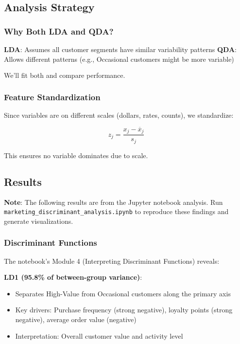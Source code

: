 \documentclass[
]{article}
\begin{document}
\subsection{Analysis Strategy}

\subsubsection{Why Both LDA and QDA?}

\textbf{LDA}: Assumes all customer segments have similar variability
patterns \textbf{QDA}: Allows different patterns (e.g., Occasional
customers might be more variable)

We'll fit both and compare performance.

\subsubsection{Feature Standardization}

Since variables are on different scales (dollars, rates, counts), we
standardize:

\[z_{j} = \frac{x_{j} - {\overline{x}}_{j}}{s_{j}}\]

This ensures no variable dominates due to scale.

\subsection{Results}

\textbf{Note}: The following results are from the Jupyter notebook
analysis. Run \texttt{marketing\_discriminant\_analysis.ipynb} to
reproduce these findings and generate visualizations.

\subsubsection{Discriminant Functions}

The notebook's Module 4 (Interpreting Discriminant Functions) reveals:

\textbf{LD1 (95.8\% of between-group variance)}:

\begin{itemize}
\item
  Separates High-Value from Occasional customers along the primary axis
\item
  Key drivers: Purchase frequency (strong negative), loyalty points
  (strong negative), average order value (negative)
\item
  Interpretation: Overall customer value and activity level
\end{itemize}
\end{document}
